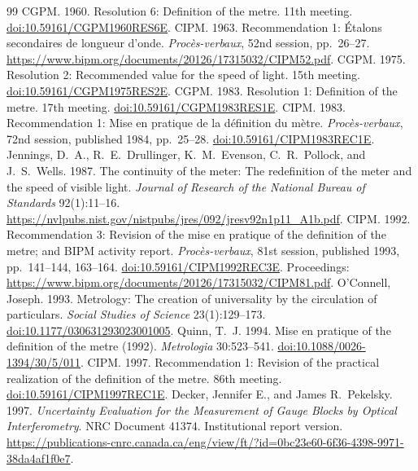 \documentclass[11pt,a4paper]{article}
\begin{document}
\begin{thebibliography}{99}
 CGPM. 1960. Resolution 6: Definition of the metre. 11th meeting. \href{https://doi.org/10.59161/CGPM1960RES6E}{doi:10.59161/CGPM1960RES6E}.
 CIPM. 1963. Recommendation 1: \'Etalons secondaires de longueur d'onde. \emph{Proc\`es-verbaux}, 52nd session, pp.~26--27. \url{https://www.bipm.org/documents/20126/17315032/CIPM52.pdf}.
 CGPM. 1975. Resolution 2: Recommended value for the speed of light. 15th meeting. \href{https://doi.org/10.59161/CGPM1975RES2E}{doi:10.59161/CGPM1975RES2E}.
 CGPM. 1983. Resolution 1: Definition of the metre. 17th meeting. \href{https://doi.org/10.59161/CGPM1983RES1E}{doi:10.59161/CGPM1983RES1E}.
 CIPM. 1983. Recommendation 1: Mise en pratique de la d\'efinition du m\`etre. \emph{Proc\`es-verbaux}, 72nd session, published 1984, pp.~25--28. \href{https://doi.org/10.59161/CIPM1983REC1E}{doi:10.59161/CIPM1983REC1E}.
 Jennings, D.~A., R.~E.~Drullinger, K.~M.~Evenson, C.~R.~Pollock, and J.~S.~Wells. 1987. The continuity of the meter: The redefinition of the meter and the speed of visible light. \emph{Journal of Research of the National Bureau of Standards} 92(1):11--16. \url{https://nvlpubs.nist.gov/nistpubs/jres/092/jresv92n1p11_A1b.pdf}.
 CIPM. 1992. Recommendation 3: Revision of the mise en pratique of the definition of the metre; and BIPM activity report. \emph{Proc\`es-verbaux}, 81st session, published 1993, pp.~141--144, 163--164. \href{https://doi.org/10.59161/CIPM1992REC3E}{doi:10.59161/CIPM1992REC3E}. Proceedings: \url{https://www.bipm.org/documents/20126/17315032/CIPM81.pdf}.
 O'Connell, Joseph. 1993. Metrology: The creation of universality by the circulation of particulars. \emph{Social Studies of Science} 23(1):129--173. \href{https://doi.org/10.1177/030631293023001005}{doi:10.1177/030631293023001005}.
 Quinn, T.~J. 1994. Mise en pratique of the definition of the metre (1992). \emph{Metrologia} 30:523--541. \href{https://doi.org/10.1088/0026-1394/30/5/011}{doi:10.1088/0026-1394/30/5/011}.
 CIPM. 1997. Recommendation 1: Revision of the practical realization of the definition of the metre. 86th meeting. \href{https://doi.org/10.59161/CIPM1997REC1E}{doi:10.59161/CIPM1997REC1E}.
 Decker, Jennifer E., and James R.~Pekelsky. 1997. \emph{Uncertainty Evaluation for the Measurement of Gauge Blocks by Optical Interferometry}. NRC Document 41374. Institutional report version. \url{https://publications-cnrc.canada.ca/eng/view/ft/?id=0bc23e60-6f36-4398-9971-38da4af1f0e7}.

\end{thebibliography}
\end{document}
